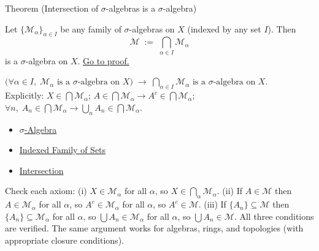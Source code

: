 
\begin{theorembox}{Theorem (Intersection of $\sigma$-algebras is a $\sigma$-algebra)}
\begin{theorem}
\label{thm:sigma-intersection}
Let $\{\mathcal{M}_\alpha\}_{\alpha \in I}$ be any family of $\sigma$-algebras
on $X$ (indexed by any set $I$). Then
\[
\mathcal{M} \;:=\; \bigcap_{\alpha \in I} \mathcal{M}_\alpha
\]
is a $\sigma$-algebra on $X$.
\hyperref[prf:sigma-intersection]{Go to proof.}
\end{theorem}
\end{theorembox}

\begin{remark*}
$\bigl(\forall\alpha\in I,\; \mathcal{M}_\alpha \text{ is a $\sigma$-algebra on }X\bigr) \;\to\; \bigcap_{\alpha\in I}\mathcal{M}_\alpha \text{ is a $\sigma$-algebra on }X$.\\
Explicitly: $X\in\bigcap\mathcal{M}_\alpha$; $A\in\bigcap\mathcal{M}_\alpha \to A^c\in\bigcap\mathcal{M}_\alpha$; $\forall n,\; A_n\in\bigcap\mathcal{M}_\alpha \to \bigcup_n A_n\in\bigcap\mathcal{M}_\alpha$.
\end{remark*}

\begin{dependencies}
\begin{itemize}
  \item \hyperref[def:sigma-algebra]{$\sigma$-Algebra}
  \item \hyperref[def:indexed-family]{Indexed Family of Sets}
  \item \hyperref[def:intersection]{Intersection}
\end{itemize}
\end{dependencies}

\begin{remark*}[Proof]
Check each axiom: (i) $X \in \mathcal{M}_\alpha$ for all $\alpha$, so
$X \in \bigcap_\alpha \mathcal{M}_\alpha$. (ii) If $A \in \mathcal{M}$ then
$A \in \mathcal{M}_\alpha$ for all $\alpha$, so $A^c \in \mathcal{M}_\alpha$
for all $\alpha$, so $A^c \in \mathcal{M}$. (iii) If $\{A_n\} \subseteq
\mathcal{M}$ then $\{A_n\} \subseteq \mathcal{M}_\alpha$ for all $\alpha$, so
$\bigcup A_n \in \mathcal{M}_\alpha$ for all $\alpha$, so $\bigcup A_n \in
\mathcal{M}$. All three conditions are verified. The same argument works for
algebras, rings, and topologies (with appropriate closure conditions).
\end{remark*}

